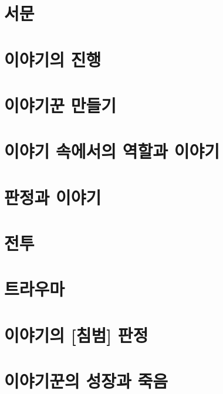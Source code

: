 \documentclass{report}
\begin{document}
	\parttoc
	
	\chapter{서문}
		
	
	\chapter{이야기의 진행}
		
	
	\chapter{이야기꾼 만들기}
		
	
	\chapter{이야기 속에서의 역할과 이야기}
		
	
	\chapter{판정과 이야기}
		
	
	\chapter{전투}
		
	
	\hypertarget{trauma}{}
	\chapter{트라우마}
		
	
	\hypertarget{intrusion}{}
	\chapter{이야기의 [침범] 판정}
		
	
	\hypertarget{growth}{}
	\chapter{이야기꾼의 성장과 죽음}
		
	
\end{document}
